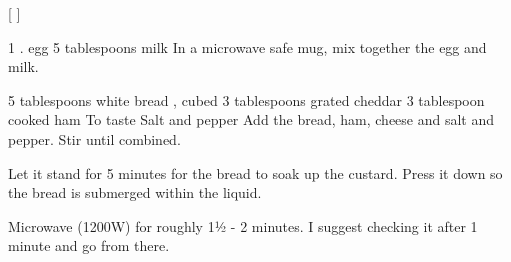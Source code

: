 
[
]

\begin{step}
1 . egg
5 tablespoons milk
\method
In a microwave safe mug, mix together the egg and milk.
\end{step}

\begin{step}
5 tablespoons white bread , cubed
3 tablespoons grated cheddar
3 tablespoon cooked ham
To taste Salt and pepper
\method
Add the bread, ham, cheese and salt and pepper. Stir until combined.

Let it stand for 5 minutes for the bread to soak up the custard. Press it down so the bread is submerged within the liquid.

Microwave (1200W) for roughly 1½ - 2 minutes. I suggest checking it after 1 minute and go from there.
\end{step}